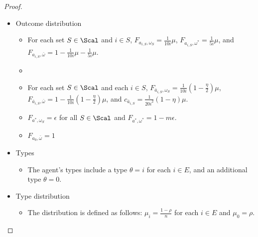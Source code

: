 \begin{proof}
\begin{itemize}
		\item Outcome distribution
		\begin{itemize}
		\item For each set $S\in \Scal$ and $i\in S$, $F_{a_{i,S},\omega_S}=\frac{1}{10i}\mu$,  $F_{a_{i,S}, \omega^*}=\frac{1}{5i}\mu$, and $F_{a_{i,S},\bar \omega}=1-\frac{1}{10i}\mu-\frac{1}{5i}\mu$.
		\item {} 
		\item For each set $S\in\Scal$ and each $i\in S$, $F_{\bar a_{i,S},\omega_S}=\frac{1}{10i}(1-\frac\eta2)\mu$, $F_{\bar a_{i,S},\bar \omega}=1-\frac{1}{10i}(1-\frac\eta2)\mu$, and $c_{\bar a_{i,S}}=\frac{1}{20i^2} (1-\eta)\mu$.
		\item $F_{a^*,\omega_S}=\epsilon$ for all $S\in\Scal$ and $F_{a^*,\omega^*}=1-m\epsilon$.
		\item $F_{a_0, \bar\omega}=1$
		\end{itemize}
		
		\item Types 
		\begin{itemize}
			\item The agent's types include a type $\theta=i$ for each $i\in E$, and an additional type $\theta=0$. 
		\end{itemize}
		
		\item Type distribution
		\begin{itemize}
			\item The distribution is defined as follows: $\mu_{i}=\frac{1-\rho}{n}$ for each $i \in E$ and $\mu_0=\rho$.
		\end{itemize}

		

\end{itemize}
\end{proof}
